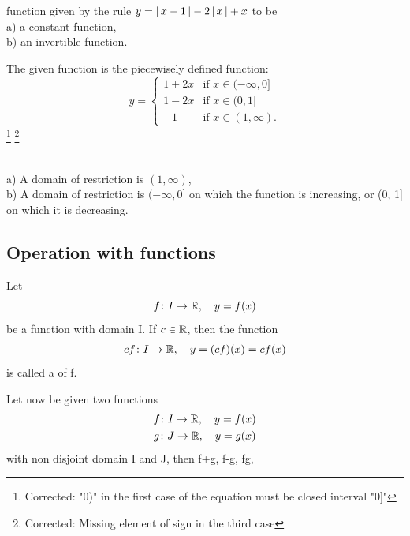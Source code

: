 \documentclass[11pt]{amsbook}
\begin{document}


function given by the rule $ y = \left \lvert \, x-1 \, \right \rvert - 2\left \lvert \, x \, \right \rvert+ x $ to be \\
a) a constant function, \\
b) an invertible function.

\begin{hSolution}
	The given function is the piecewisely defined function:
	\[
		y = 
		\begin{cases}
			1+2x & \text{if }x \in(-\infty, 0] \\
			1-2x & \text{if }x \in(0, 1] \\
			-1 & \text{if }x \in(1, \infty).
		\end{cases}
	\]
\footnote{Corrected: "0)" in the first case of the equation must be closed interval "0]"}
\footnote{Corrected: Missing element of sign in the third case}
\end{hSolution}\\
a) A domain of restriction is $(1, \infty)$, \\
b) A domain of restriction is $(-\infty, 0]$ on which the function is increasing, or (0, 1] on which it is decreasing.

\subsection{Operation with functions}
Let
\[
	f\colon I \to \mathbb{R},\quad y = f(x)
\]
be a function with domain I. If $c \in \mathbb{R}$, then the function
\begin{align}
	\label{eq:b1p1_053_scalarMultiple}
	cf\colon I \to \mathbb{R},\quad y = (cf)(x) = cf(x)
\end{align}
is called a  of f.

Let now be given two functions
\begin{gather*}
	f\colon I \to \mathbb{R},\quad y= f(x) \\
	g\colon J \to \mathbb{R},\quad y= g(x)
\end{gather*}
with non disjoint domain I and J, then f+g, f-g, fg,

\end{document}
